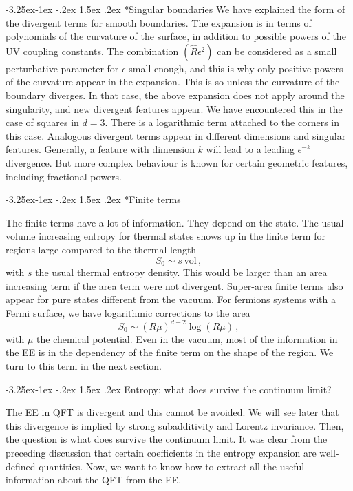 \documentclass[11pt]{article}
\makeatletter
\renewcommand\subsection{\@startsection{subsection}{2}{\z@}%
                                   {-3.25ex\@plus -1ex \@minus -.2ex}%
                                     {1.5ex \@plus .2ex}%
                                     {\normalfont\bfseries}}
\renewcommand\subsubsection{\@startsection{subsubsection}{3}{\z@}%
                                   {-3.25ex\@plus -1ex \@minus -.2ex}%
                                     {1.5ex \@plus .2ex}%
                                     {\normalfont\itshape}}
\numberwithin{equation}{section}
\newcommand{\be}{\begin{equation}}
\newcommand{\ee}{\end{equation}}
\makeatother
\begin{document}
\subsubsection*{Singular boundaries}
We have explained the form of the divergent terms for smooth boundaries. 
The expansion is in terms of polynomials of the curvature of the surface, in addition to possible powers of the UV coupling constants. 
 The combination $(\hat{R}\epsilon^2)$ can be considered as a small perturbative parameter for $\epsilon$ small enough, and this is why only positive powers of the curvature appear in the expansion.  This is so unless the curvature of the boundary diverges. In that case, the above expansion does not apply around the singularity, and new divergent features appear.
 We have encountered this in the case of squares in $d=3$. There is a logarithmic term attached to the corners in this case. Analogous divergent terms appear in different dimensions and singular features. Generally, a feature with dimension $k$ will lead to a leading $\epsilon^{-k}$ divergence. But more complex behaviour is known for certain geometric features, including fractional powers.  

\subsubsection*{Finite terms}

The finite terms have a lot of information. They depend on the state. The usual volume increasing entropy for thermal states shows up in the finite term for regions large compared to the thermal length
\be
S_0\sim s\,\textrm{vol}\,,  
\ee
with $s$ the usual thermal entropy density. This would be larger than an area increasing term if the area term were not divergent. Super-area finite terms also appear for pure states different from the vacuum. For fermions systems with a Fermi surface, we have logarithmic corrections to the area 
\be
S_0\sim (R\mu)^{d-2} \log(R \mu)\,,  
\ee
with $\mu$ the chemical potential. Even in the vacuum, most of the information in the EE is in the dependency of the finite term on the shape of the region.   
We turn to this term in the next section. 

\subsection{Entropy: what does survive the continuum limit?}
\label{regent}


The EE in QFT is divergent and this cannot be avoided. We will see later that this divergence is implied by strong subadditivity and Lorentz invariance. Then, the question is what does survive the continuum limit. It was clear from the preceding discussion that certain coefficients in the entropy expansion are well-defined quantities. Now, we want to know how to extract all the useful information about the QFT from the EE.
  
\end{document}
